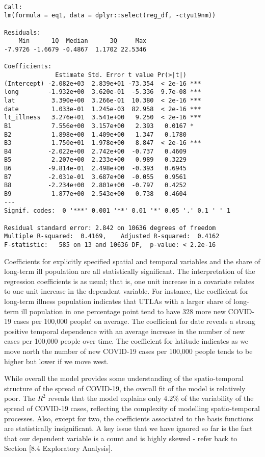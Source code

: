 \documentclass[
  letterpaper,
  krantz2]{style/krantz}
\begin{document}
\begin{verbatim}

Call:
lm(formula = eq1, data = dplyr::select(reg_df, -ctyu19nm))

Residuals:
    Min      1Q  Median      3Q     Max 
-7.9726 -1.6679 -0.4867  1.1702 22.5346 

Coefficients:
              Estimate Std. Error t value Pr(>|t|)    
(Intercept) -2.082e+03  2.839e+01 -73.354  < 2e-16 ***
long        -1.932e+00  3.620e-01  -5.336  9.7e-08 ***
lat          3.390e+00  3.266e-01  10.380  < 2e-16 ***
date         1.033e-01  1.245e-03  82.958  < 2e-16 ***
lt_illness   3.276e+01  3.541e+00   9.250  < 2e-16 ***
B1           7.556e+00  3.157e+00   2.393   0.0167 *  
B2           1.898e+00  1.409e+00   1.347   0.1780    
B3           1.750e+01  1.978e+00   8.847  < 2e-16 ***
B4          -2.022e+00  2.742e+00  -0.737   0.4609    
B5           2.207e+00  2.233e+00   0.989   0.3229    
B6          -9.814e-01  2.498e+00  -0.393   0.6945    
B7          -2.031e-01  3.687e+00  -0.055   0.9561    
B8          -2.234e+00  2.801e+00  -0.797   0.4252    
B9           1.877e+00  2.543e+00   0.738   0.4604    
---
Signif. codes:  0 '***' 0.001 '**' 0.01 '*' 0.05 '.' 0.1 ' ' 1

Residual standard error: 2.842 on 10636 degrees of freedom
Multiple R-squared:  0.4169,    Adjusted R-squared:  0.4162 
F-statistic:   585 on 13 and 10636 DF,  p-value: < 2.2e-16
\end{verbatim}

Coefficients for explicitly specified spatial and temporal variables and
the share of long-term ill population are all statistically significant.
The interpretation of the regression coefficients is as usual; that is,
one unit increase in a covariate relates to one unit increase in the
dependent variable. For instance, the coefficient for long-term illness
population indicates that UTLAs with a larger share of long-term ill
population in one percentage point tend to have 328 more new COVID-19
cases per 100,000 people! on average. The coefficient for date reveals a
strong positive temporal dependence with an average increase in the
number of new cases per 100,000 people over time. The coefficient for
latitude indicates as we move north the number of new COVID-19 cases per
100,000 people tends to be higher but lower if we move west.

While overall the model provides some understanding of the
spatio-temporal structure of the spread of COVID-19, the overall fit of
the model is relatively poor. The \(R^{2}\) reveals that the model
explains only 4.2\% of the variability of the spread of COVID-19 cases,
reflecting the complexity of modelling spatio-temporal processes. Also,
except for two, the coefficients associated to the basis functions are
statistically insignificant. A key issue that we have ignored so far is
the fact that our dependent variable is a count and is highly skewed -
refer back to Section {[}8.4 Exploratory Analysis{]}.
\end{document}
